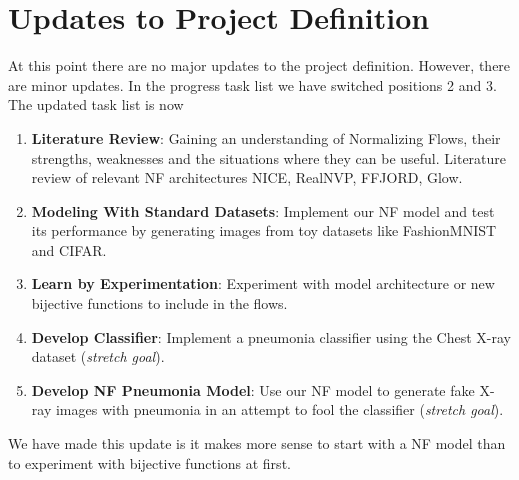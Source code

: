 \section{Updates to Project Definition}
At this point there are no major updates to the project definition. However,
   there are minor updates. In the progress task list we have switched positions
   2 and 3. The updated task list is now
\begin{enumerate} 
	\item \textbf{Literature Review}: Gaining an understanding of
		Normalizing Flows, their strengths, weaknesses and the
		situations where they can be useful. Literature review of
		relevant NF architectures NICE\cite{nice},
		RealNVP\cite{real_nvp}, FFJORD\cite{ffjord}, Glow\cite{glow}.  
	\item \textbf{Modeling With Standard Datasets}: Implement our NF model
		and test its performance by generating images from toy datasets
		like FashionMNIST and CIFAR.  
	\item \textbf{Learn by Experimentation}: Experiment with model
		architecture or new bijective functions to include in the
		flows.  
	\item \textbf{Develop Classifier}: Implement a pneumonia classifier
		using the Chest X-ray dataset (\textit{stretch goal}).  
	\item \textbf{Develop NF Pneumonia Model}: Use our NF model to generate
		fake X-ray images with pneumonia in an attempt to fool the
		classifier (\textit{stretch goal}).  
\end{enumerate}
We have made this update is it makes more sense to start with a NF model than to
experiment with bijective functions at first. 

